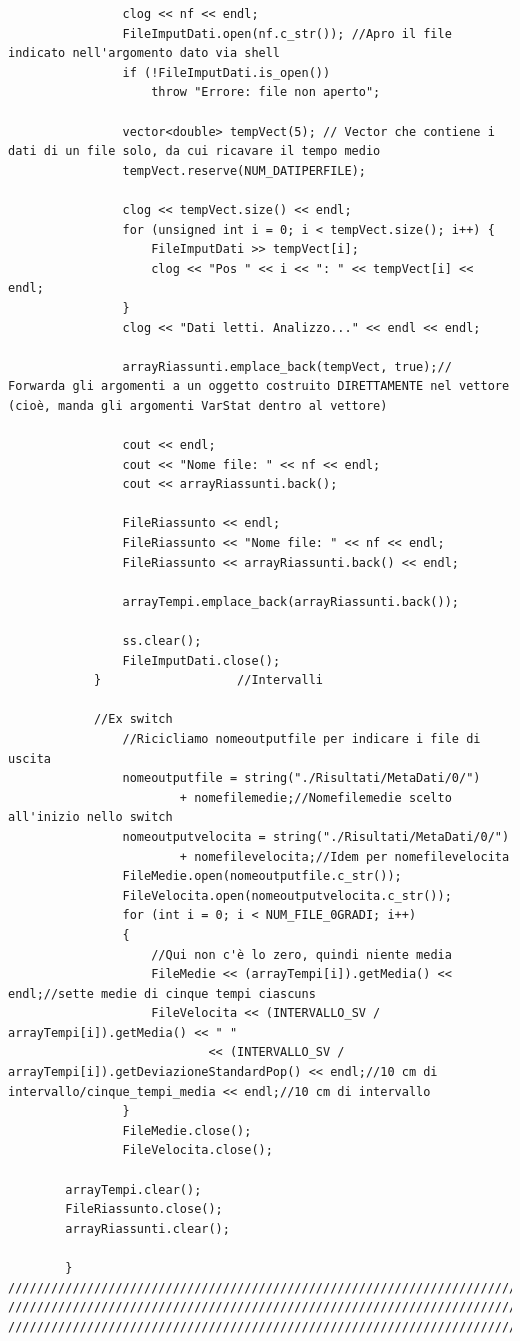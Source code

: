 \documentclass[12pt]{article} %
\begin{document}
\begin{verbatim}
				clog << nf << endl;
				FileImputDati.open(nf.c_str());	//Apro il file indicato nell'argomento dato via shell
				if (!FileImputDati.is_open())
					throw "Errore: file non aperto";

				vector<double> tempVect(5);	// Vector che contiene i dati di un file solo, da cui ricavare il tempo medio
				tempVect.reserve(NUM_DATIPERFILE);

				clog << tempVect.size() << endl;
				for (unsigned int i = 0; i < tempVect.size(); i++) {
					FileImputDati >> tempVect[i];
					clog << "Pos " << i << ": " << tempVect[i] << endl;
				}
				clog << "Dati letti. Analizzo..." << endl << endl;

				arrayRiassunti.emplace_back(tempVect, true);// Forwarda gli argomenti a un oggetto costruito DIRETTAMENTE nel vettore (cioè, manda gli argomenti VarStat dentro al vettore)

				cout << endl;
				cout << "Nome file: " << nf << endl;
				cout << arrayRiassunti.back();

				FileRiassunto << endl;
				FileRiassunto << "Nome file: " << nf << endl;
				FileRiassunto << arrayRiassunti.back() << endl;

				arrayTempi.emplace_back(arrayRiassunti.back());

				ss.clear();
				FileImputDati.close();
			}					//Intervalli

			//Ex switch
				//Ricicliamo nomeoutputfile per indicare i file di uscita
				nomeoutputfile = string("./Risultati/MetaDati/0/")
						+ nomefilemedie;//Nomefilemedie scelto all'inizio nello switch
				nomeoutputvelocita = string("./Risultati/MetaDati/0/")
						+ nomefilevelocita;//Idem per nomefilevelocita
				FileMedie.open(nomeoutputfile.c_str());
				FileVelocita.open(nomeoutputvelocita.c_str());
				for (int i = 0; i < NUM_FILE_0GRADI; i++)
				{
					//Qui non c'è lo zero, quindi niente media
					FileMedie << (arrayTempi[i]).getMedia() << endl;//sette medie di cinque tempi ciascuns
					FileVelocita << (INTERVALLO_SV / arrayTempi[i]).getMedia() << " "
							<< (INTERVALLO_SV / arrayTempi[i]).getDeviazioneStandardPop() << endl;//10 cm di intervallo/cinque_tempi_media << endl;//10 cm di intervallo
				}
				FileMedie.close();
				FileVelocita.close();

		arrayTempi.clear();
		FileRiassunto.close();
		arrayRiassunti.clear();

		}
///////////////////////////////////////////////////////////////////////////////////////////////////
///////////////////////////////////////////////////////////////////////////////////////////////////
///////////////////////////////////////////////////////////////////////////////////////////////////











\end{verbatim}
\end{document}

